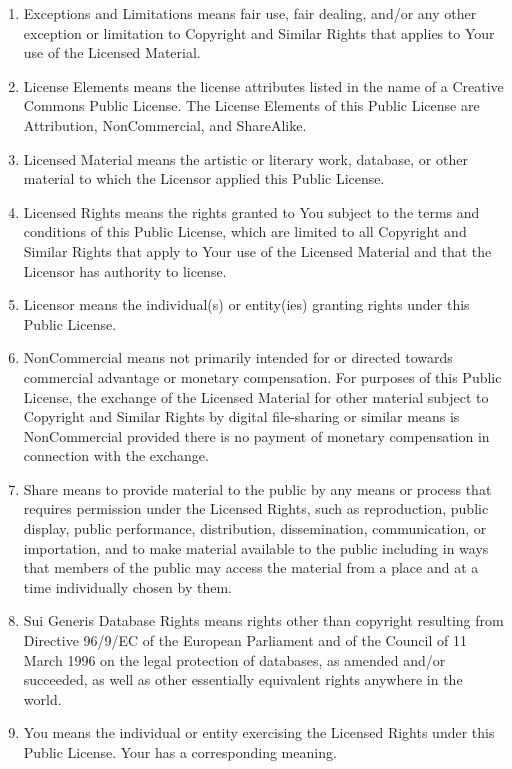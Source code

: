 \documentclass[]{scrbook}
\begin{document}
\begin{enumerate}
\item
  Exceptions and Limitations means fair use, fair dealing, and/or any
  other exception or limitation to Copyright and Similar Rights that
  applies to Your use of the Licensed Material.
\item
  License Elements means the license attributes listed in the name of a
  Creative Commons Public License. The License Elements of this Public
  License are Attribution, NonCommercial, and ShareAlike.
\item
  Licensed Material means the artistic or literary work, database, or
  other material to which the Licensor applied this Public License.
\item
  Licensed Rights means the rights granted to You subject to the terms
  and conditions of this Public License, which are limited to all
  Copyright and Similar Rights that apply to Your use of the Licensed
  Material and that the Licensor has authority to license.
\item
  Licensor means the individual(s) or entity(ies) granting rights under
  this Public License.
\item
  NonCommercial means not primarily intended for or directed towards
  commercial advantage or monetary compensation. For purposes of this
  Public License, the exchange of the Licensed Material for other
  material subject to Copyright and Similar Rights by digital
  file-sharing or similar means is NonCommercial provided there is no
  payment of monetary compensation in connection with the exchange.
\item
  Share means to provide material to the public by any means or process
  that requires permission under the Licensed Rights, such as
  reproduction, public display, public performance, distribution,
  dissemination, communication, or importation, and to make material
  available to the public including in ways that members of the public
  may access the material from a place and at a time individually chosen
  by them.
\item
  Sui Generis Database Rights means rights other than copyright
  resulting from Directive 96/9/EC of the European Parliament and of the
  Council of 11 March 1996 on the legal protection of databases, as
  amended and/or succeeded, as well as other essentially equivalent
  rights anywhere in the world.
\item
  You means the individual or entity exercising the Licensed Rights
  under this Public License. Your has a corresponding meaning.
\end{enumerate}
\end{document}
